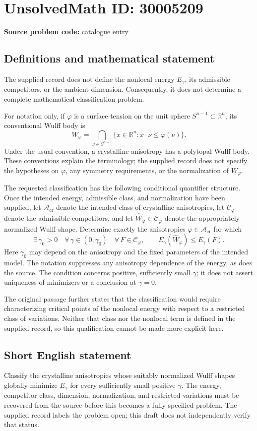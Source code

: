 \documentclass[11pt]{article}
\newcommand{\R}{\mathbb{R}}
\begin{document}
\section*{UnsolvedMath ID: 30005209}
\textbf{Source problem code:} catalogue entry
\subsection{Definitions and mathematical statement}
The supplied record does not define the nonlocal energy \(E_\gamma\), its admissible competitors, or the ambient dimension. Consequently, it does not determine a complete mathematical classification problem.

For notation only, if \(\varphi\) is a surface tension on the unit sphere \(S^{n-1}\subset\R^n\), its conventional Wulff body is
\[
W_\varphi=\bigcap_{\nu\in S^{n-1}}\{x\in\R^n:x\cdot\nu\leq\varphi(\nu)\}.
\]
Under the usual convention, a crystalline anisotropy has a polytopal Wulff body. These conventions explain the terminology; the supplied record does not specify the hypotheses on \(\varphi\), any symmetry requirements, or the normalization of \(W_\varphi\).

The requested classification has the following conditional quantifier structure. Once the intended energy, admissible class, and normalization have been supplied, let \(\mathcal A_{\mathrm{cr}}\) denote the intended class of crystalline anisotropies, let \(\mathcal C_\varphi\) denote the admissible competitors, and let \(\widehat W_\varphi\in\mathcal C_\varphi\) denote the appropriately normalized Wulff shape. Determine exactly the anisotropies \(\varphi\in\mathcal A_{\mathrm{cr}}\) for which
\[
\exists\,\gamma_0>0\quad
\forall\,\gamma\in(0,\gamma_0)\quad
\forall\,F\in\mathcal C_\varphi,
\qquad E_\gamma(\widehat W_\varphi)\leq E_\gamma(F).
\]
Here \(\gamma_0\) may depend on the anisotropy and the fixed parameters of the intended model. The notation suppresses any anisotropy dependence of the energy, as does the source. The condition concerns positive, sufficiently small \(\gamma\); it does not assert uniqueness of minimizers or a conclusion at \(\gamma=0\).

The original passage further states that the classification would require characterizing critical points of the nonlocal energy with respect to a restricted class of variations. Neither that class nor the nonlocal term is defined in the supplied record, so this qualification cannot be made more explicit here.
\subsection{Short English statement}
Classify the crystalline anisotropies whose suitably normalized Wulff shapes globally minimize \(E_\gamma\) for every sufficiently small positive \(\gamma\). The energy, competitor class, dimension, normalization, and restricted variations must be recovered from the source before this becomes a fully specified problem. The supplied record labels the problem open; this draft does not independently verify that status.
\end{document}
